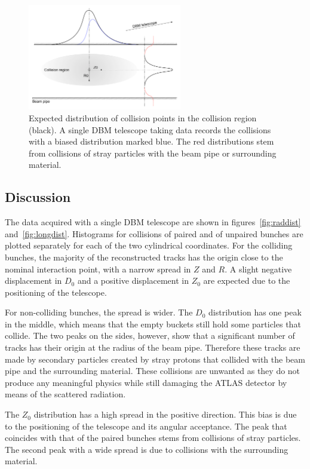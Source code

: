 \begin{figure}[!t]
\centering
\includegraphics[width=0.6\textwidth]{04_charge_monitoring/pics/positioningdata}
\caption{Expected distribution of collision points in the collision region (black). A single DBM telescope taking data records the collisions with a biased distribution marked blue. The red distributions stem from collisions of stray particles with the beam pipe or surrounding material.}
\label{fig:positioningdata}
\end{figure}

\subsection{Discussion}
The data acquired with a single DBM telescope are shown in figures~\ref{fig:raddist} and~\ref{fig:longdist}. Histograms for collisions of paired and of unpaired bunches are plotted separately for each of the two cylindrical coordinates. For the colliding bunches, the majority of the reconstructed tracks has the origin close to the nominal interaction point, with a narrow spread in $Z$ and $R$. A slight negative displacement in $D_\mathrm{0}$ and a positive displacement in $Z_\mathrm{0}$ are expected due to the positioning of the telescope.

For non-colliding bunches, the spread is wider. The $D_\mathrm{0}$ distribution has one peak in the middle, which means that the empty buckets still hold some particles that collide. The two peaks on the sides, however, show that a significant number of tracks has their origin at the radius of the beam pipe. Therefore these tracks are made by secondary particles created by stray protons that collided with the beam pipe and the surrounding material. These collisions are unwanted as they do not produce any meaningful physics while still damaging the ATLAS detector by means of the scattered radiation. 

The $Z_\mathrm{0}$ distribution has a high spread in the positive direction. This bias is due to the positioning of the telescope and its angular acceptance. The peak that coincides with that of the paired bunches stems from collisions of stray particles. The second peak with a wide spread is due to collisions with the surrounding material.

